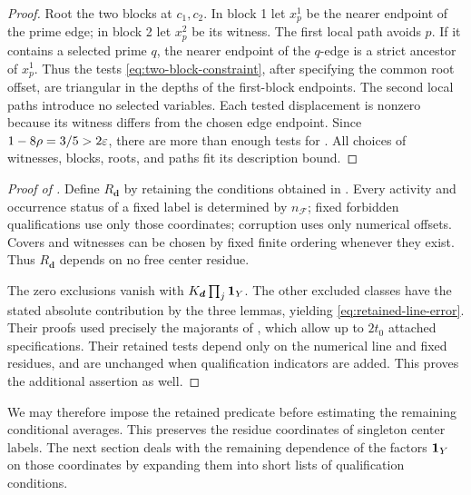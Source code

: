 \begin{proof}
Root the two blocks at $c_1,c_2$.  In block 1 let $x_p^1$ be the
nearer endpoint of the prime edge; in block 2 let $x_p^2$ be its
witness.  The first local path avoids $p$.  If it contains a
selected prime $q$, the nearer endpoint of the $q$-edge is a
strict ancestor of $x_p^1$.  Thus the tests
\eqref{eq:two-block-constraint}, after specifying the common root
offset, are triangular in the depths of the first-block
endpoints.  The second local paths introduce no selected
variables.  Each tested displacement is nonzero because its
witness differs from the chosen edge endpoint.  Since
$1-8\rho=3/5>2\varepsilon$, there are more than enough tests for
.  All choices of witnesses, blocks,
roots, and paths fit its description bound.
\end{proof}

\begin{proof}[Proof of ]
Define $R_{\boldsymbol d}$ by retaining the conditions obtained
in .
Every activity and occurrence status of a fixed label is determined
by $n_{\mathcal F}$; fixed forbidden qualifications use only those
coordinates; corruption uses only numerical offsets.  Covers and
witnesses can be chosen by fixed finite ordering whenever they
exist.  Thus $R_{\boldsymbol d}$ depends on no free center residue.

The zero exclusions vanish with $K_{\boldsymbol d}\prod_j\mathbf 1_Y$.
The other excluded classes have the stated absolute contribution
by the three lemmas, yielding \eqref{eq:retained-line-error}.
Their proofs used precisely the majorants of
, which allow up to
$2t_0$ attached specifications.  Their retained tests depend only
on the numerical line and fixed residues, and are unchanged when
qualification indicators are added.  This proves the additional assertion as well.
\end{proof}

We may therefore impose the retained predicate before estimating
the remaining conditional averages.  This preserves the residue
coordinates of singleton center labels.  The next section deals
with the remaining dependence of the factors $\mathbf 1_Y$ on those
coordinates by expanding them into short lists of qualification
conditions.
